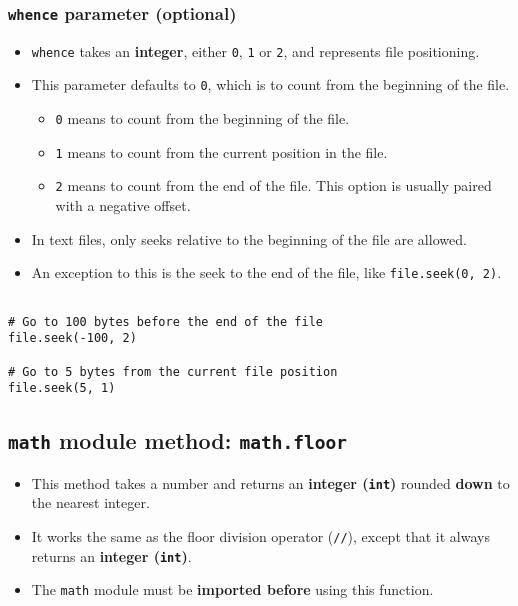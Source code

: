 \documentclass[11pt]{article}
\begin{document}
\subsubsection{\texttt{whence} parameter (optional)}
\label{sec:org7f9b429}
\begin{itemize}
\item \texttt{whence} takes an \textbf{integer}, either \texttt{0}, \texttt{1} or \texttt{2}, and represents file positioning.
\item This parameter defaults to \texttt{0}, which is to count from the beginning of the file.
\begin{itemize}
\item \texttt{0} means to count from the beginning of the file.
\item \texttt{1} means to count from the current position in the file.
\item \texttt{2} means to count from the end of the file. This option is usually paired with a negative offset.
\end{itemize}

\item In text files, only seeks relative to the beginning of the file are allowed.
\item An exception to this is the seek to the end of the file, like \texttt{file.seek(0, 2)}.
\end{itemize}

\begin{verbatim}

# Go to 100 bytes before the end of the file
file.seek(-100, 2)

# Go to 5 bytes from the current file position
file.seek(5, 1)
\end{verbatim}

 \newpage

\subsection{\texttt{math} module method: \texttt{math.floor}}
\label{sec:org2e584e8}
\begin{itemize}
\item This method takes a number and returns an \textbf{integer (\texttt{int})} rounded \textbf{down} to the nearest integer.
\item It works the same as the floor division operator (\texttt{//}), except that it always returns an \textbf{integer (\texttt{int})}.
\item The \texttt{math} module must be \textbf{imported before} using this function.
\end{itemize}
\end{document}
